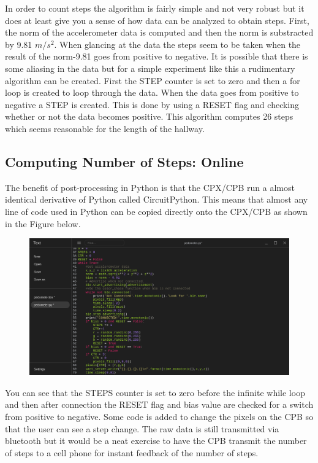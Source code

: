 In order to count steps the algorithm is fairly simple and not very robust but it does at least give you a sense of how data can be analyzed to obtain steps. First, the norm of the accelerometer data is computed and then the norm is substracted by 9.81 $m/s^2$. When glancing at the data the steps seem to be taken when the result of the norm-9.81 goes from positive to negative. It is possible that there is some aliasing in the data but for a simple experiment like this a rudimentary algorithm can be created. First the STEP counter is set to zero and then a for loop is created to loop through the data. When the data goes from positive to negative a STEP is created. This is done by using a RESET flag and checking whether or not the data becomes positive. This algorithm computes 26 steps which seems reasonable for the length of the hallway.

\subsection{Computing Number of Steps: Online}

The benefit of post-processing in Python is that the CPX/CPB run a almost identical derivative of Python called CircuitPython. This means that almost any line of code used in Python can be copied directly onto the CPX/CPB as shown in the Figure below.
\begin{figure}[H]
  \begin{center}
    \includegraphics[width=\textwidth]{Figures/Pedometer4.png}
  \end{center}
\end{figure}
You can see that the STEPS counter is set to zero before the infinite while loop and then after connection the RESET flag and bias value are checked for a switch from positive to negative. Some code is added to change the pixels on the CPB so that the user can see a step change. The raw data is still transmitted via bluetooth but it would be a neat exercise to have the CPB transmit the number of steps to a cell phone for instant feedback of the number of steps. 

